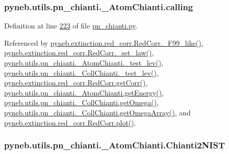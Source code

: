 \subsubsection[{calling}]{\setlength{\rightskip}{0pt plus 5cm}pyneb.\+utils.\+pn\+\_\+chianti.\+\_\+\+Atom\+Chianti.\+calling}\label{classpyneb_1_1utils_1_1pn__chianti_1_1___atom_chianti_af0303fd3e5fd4db39d3d1cdf62b2e4bc}


Definition at line \hyperlink{pn__chianti_8py_source_l00223}{223} of file \hyperlink{pn__chianti_8py_source}{pn\+\_\+chianti.\+py}.



Referenced by \hyperlink{red__corr_8py_source_l00658}{pyneb.\+extinction.\+red\+\_\+corr.\+Red\+Corr.\+\_\+\+F99\+\_\+like()}, \hyperlink{red__corr_8py_source_l00176}{pyneb.\+extinction.\+red\+\_\+corr.\+Red\+Corr.\+\_\+set\+\_\+law()}, \hyperlink{pn__chianti_8py_source_l00284}{pyneb.\+utils.\+pn\+\_\+chianti.\+\_\+\+Atom\+Chianti.\+\_\+test\+\_\+lev()}, \hyperlink{pn__chianti_8py_source_l00449}{pyneb.\+utils.\+pn\+\_\+chianti.\+\_\+\+Coll\+Chianti.\+\_\+test\+\_\+lev()}, \hyperlink{red__corr_8py_source_l00211}{pyneb.\+extinction.\+red\+\_\+corr.\+Red\+Corr.\+get\+Corr()}, \hyperlink{pn__chianti_8py_source_l00346}{pyneb.\+utils.\+pn\+\_\+chianti.\+\_\+\+Atom\+Chianti.\+get\+Energy()}, \hyperlink{pn__chianti_8py_source_l00484}{pyneb.\+utils.\+pn\+\_\+chianti.\+\_\+\+Coll\+Chianti.\+get\+Omega()}, \hyperlink{pn__chianti_8py_source_l00461}{pyneb.\+utils.\+pn\+\_\+chianti.\+\_\+\+Coll\+Chianti.\+get\+Omega\+Array()}, and \hyperlink{red__corr_8py_source_l00303}{pyneb.\+extinction.\+red\+\_\+corr.\+Red\+Corr.\+plot()}.

\hypertarget{classpyneb_1_1utils_1_1pn__chianti_1_1___atom_chianti_af40dabefe9f067611af9696725412980}{}
\subsubsection[{Chianti2\+N\+I\+S\+T}]{\setlength{\rightskip}{0pt plus 5cm}pyneb.\+utils.\+pn\+\_\+chianti.\+\_\+\+Atom\+Chianti.\+Chianti2\+N\+I\+S\+T}\label{classpyneb_1_1utils_1_1pn__chianti_1_1___atom_chianti_af40dabefe9f067611af9696725412980}


